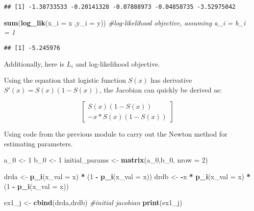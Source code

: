 \documentclass[
]{article}
\newenvironment{Shaded}{\begin{snugshade}}{\end{snugshade}}
\newcommand{\CommentTok}[1]{\textcolor[rgb]{0.56,0.35,0.01}{\textit{#1}}}
\newcommand{\DataTypeTok}[1]{\textcolor[rgb]{0.13,0.29,0.53}{#1}}
\newcommand{\DecValTok}[1]{\textcolor[rgb]{0.00,0.00,0.81}{#1}}
\newcommand{\KeywordTok}[1]{\textcolor[rgb]{0.13,0.29,0.53}{\textbf{#1}}}
\newcommand{\NormalTok}[1]{#1}
\newcommand{\OperatorTok}[1]{\textcolor[rgb]{0.81,0.36,0.00}{\textbf{#1}}}
\newcommand{\StringTok}[1]{\textcolor[rgb]{0.31,0.60,0.02}{#1}}
\begin{document}
\begin{verbatim}
## [1] -1.38733533 -0.20141328 -0.07888973 -0.04858735 -3.52975042
\end{verbatim}

\begin{Shaded}
\begin{Highlighting}[]
\KeywordTok{sum}\NormalTok{(}\KeywordTok{log\_lik}\NormalTok{(}\DataTypeTok{x\_i =}\NormalTok{ x ,}\DataTypeTok{y\_i =}\NormalTok{ y)) }\CommentTok{\#log{-}likelihood objective, assuming a\_i = b\_i = 1}
\end{Highlighting}
\end{Shaded}

\begin{verbatim}
## [1] -5.245976
\end{verbatim}

Additionally, here is \(L_i\) and log-likelihood objective.

Using the equation that logistic function \(S(x)\) has derivative
\(S'(x) = S(x)(1 - S(x))\), the Jacobian can quickly be derived as:

\[\begin {bmatrix}
S(x)(1-S(x)) \\
-x * S(x)(1-S(x))
\end {bmatrix}\]

Using code from the previous module to carry out the Newton method for
estimating parameters.

\begin{Shaded}
\begin{Highlighting}[]
\NormalTok{a\_}\DecValTok{0}\NormalTok{ \textless{}{-}}\StringTok{ }\DecValTok{1}
\NormalTok{b\_}\DecValTok{0}\NormalTok{ \textless{}{-}}\StringTok{ }\DecValTok{1}
\NormalTok{initial\_params \textless{}{-}}\StringTok{ }\KeywordTok{matrix}\NormalTok{(a\_}\DecValTok{0}\NormalTok{,b\_}\DecValTok{0}\NormalTok{, }\DataTypeTok{nrow =} \DecValTok{2}\NormalTok{)}


\NormalTok{drda \textless{}{-}}\StringTok{ }\KeywordTok{p\_i}\NormalTok{(}\DataTypeTok{x\_val =}\NormalTok{ x) }\OperatorTok{*}\StringTok{ }\NormalTok{(}\DecValTok{1} \OperatorTok{{-}}\StringTok{ }\KeywordTok{p\_i}\NormalTok{(}\DataTypeTok{x\_val =}\NormalTok{ x))}
\NormalTok{drdb \textless{}{-}}\StringTok{ }\OperatorTok{{-}}\NormalTok{x }\OperatorTok{*}\StringTok{ }\KeywordTok{p\_i}\NormalTok{(}\DataTypeTok{x\_val =}\NormalTok{ x) }\OperatorTok{*}\StringTok{ }\NormalTok{(}\DecValTok{1} \OperatorTok{{-}}\StringTok{ }\KeywordTok{p\_i}\NormalTok{(}\DataTypeTok{x\_val =}\NormalTok{ x))}

\NormalTok{ex1\_j \textless{}{-}}\StringTok{ }\KeywordTok{cbind}\NormalTok{(drda,drdb) }\CommentTok{\#initial jacobian}
\KeywordTok{print}\NormalTok{(ex1\_j)}
\end{Highlighting}
\end{Shaded}
\end{document}
